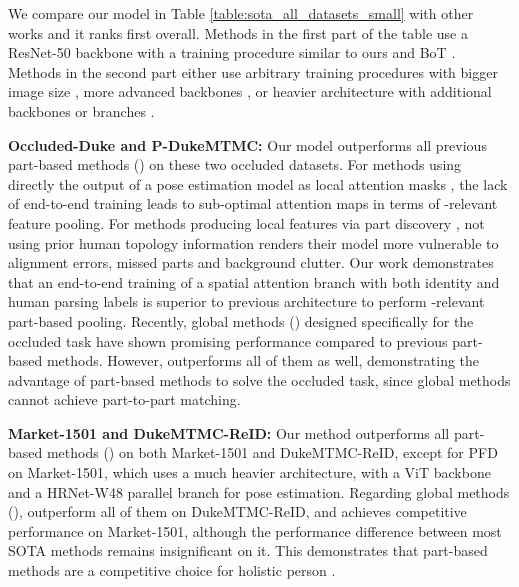 \documentclass[10pt,twocolumn,letterpaper]{article}
\begin{document}
We compare our model in Table \ref{table:sota_all_datasets_small} with other {\reid} works and it ranks first overall.
Methods in the first part of the table use a ResNet-50 backbone with a training procedure similar to ours and BoT \cite{BoT}.
Methods in the second part either use arbitrary training procedures with bigger image size \cite{HPNet, PVPM, PGFL-KD, LDS}, more advanced backbones \cite{PFD, FED, ISP, OPReID}, or heavier architecture with additional backbones or branches \cite{PFD, PVPM, HOReID, LDS, PGFL-KD, PAT}.











\textbf{Occluded-Duke and P-DukeMTMC:}
Our model outperforms all previous part-based methods () on these two occluded datasets.
For methods using directly the output of a pose estimation model as local attention masks \cite{HOReID, PGFA, PVPM, PFD}, the lack of end-to-end training leads to sub-optimal attention maps in terms of {\reid}-relevant feature pooling. For methods producing local features via part discovery \cite{ISP, PAT}, not using prior human topology information renders their model more vulnerable to alignment errors, missed parts and background clutter.
Our work demonstrates that an end-to-end training of a spatial attention branch with both identity and human parsing labels is superior to previous architecture to perform {\reid}-relevant part-based pooling.
Recently, global methods () designed specifically for the occluded {\reid} task \cite{HG, FED, LDS, OPReID} have shown promising performance compared to previous part-based methods. However, {\model} outperforms all of them as well, demonstrating the advantage of part-based methods to solve the occluded task, since global methods cannot achieve part-to-part matching.


\textbf{Market-1501 and DukeMTMC-ReID:} 
Our method outperforms all part-based methods () on both Market-1501 and DukeMTMC-ReID, except for PFD \cite{PFD} on Market-1501, which uses a much heavier architecture, with a ViT backbone and a HRNet-W48 parallel branch for pose estimation.
Regarding global methods (), {\model} outperform all of them on DukeMTMC-ReID, and achieves competitive performance on Market-1501, although the performance difference between most SOTA methods remains insignificant on it.
This demonstrates that part-based methods are a competitive choice for holistic person {\reid}.
\end{document}

